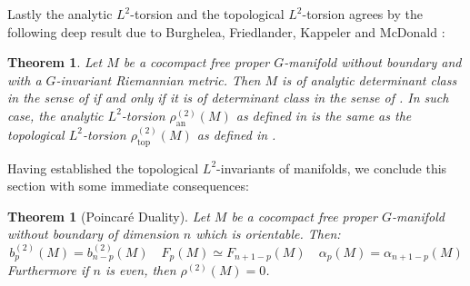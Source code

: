 \documentclass[11pt]{report}
\theoremstyle{definition}
\theoremstyle{plain}
\newtheorem{Theo}[Def]{Theorem}
\begin{document}
\par Lastly the analytic $L^2$-torsion and the topological $L^2$-torsion agrees by the following deep result due to Burghelea, Friedlander, Kappeler and McDonald \cite{burghelea1996}:
\begin{Theo}\label{3.149}
	Let $M$ be a cocompact free proper $G$-manifold without boundary and with a $G$-invariant Riemannian metric. Then  $M$ is of analytic determinant class in the sense of  if and only if it is of determinant class in the sense of . In such case, the analytic $L^2$-torsion $\rho^{(2)}_{\mathrm{an}}(M)$ as defined in  is the same as the topological $L^2$-torsion $\rho^{(2)}_{\mathrm{top}}(M)$ as defined in .
\end{Theo}
Having established the topological $L^2$-invariants of manifolds, we conclude this section with some immediate consequences:
\begin{Theo}[Poincar\'e Duality]\label{poincare}
	Let $M$ be a cocompact free proper $G$-manifold without boundary of dimension $n$ which is orientable. Then:
	\begin{equation}
	b^{(2)}_p(M)=b^{(2)}_{n-p}(M) \quad F_p(M)\simeq F_{n+1-p}(M) \quad \alpha_p(M)=\alpha_{n+1-p}(M)
	\end{equation}
	Furthermore if $n$ is even, then $\rho^{(2)}(M)=0$.
\end{Theo}
\end{document}

